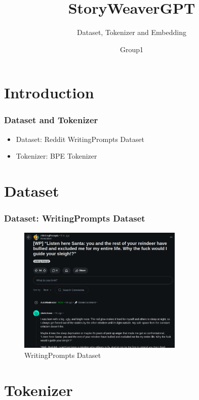 \documentclass[
    10pt %
    16:9, %
]{beamer}
\title{StoryWeaverGPT}
\subtitle{Dataset, Tokenizer and Embedding}
\author{Group1}
\begin{document}
\frame{\titlepage} %
\section[Outline]{}
\frame{\tableofcontents}

\section{Introduction}
 
 
\frame %
{
  \frametitle{Dataset and Tokenizer}
 
  \begin{itemize}
    \item Dataset: Reddit WritingPrompts Dataset
    \item Tokenizer: BPE Tokenizer
  \end{itemize}
  
\vfill   
}

\section{Dataset}
 
 \frame %
{
  \frametitle{Dataset: WritingPrompts Dataset}
  \begin{figure}
    \centering
    \includegraphics[width=0.7\textwidth]{dataset.png}
    \caption{WritingPrompts Dataset}
  \end{figure}
}


\section{Tokenizer}
 
\end{document}
